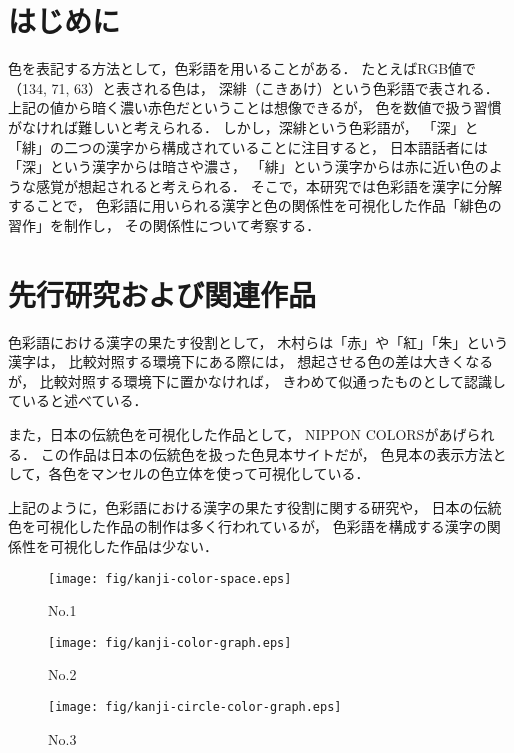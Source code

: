 \documentclass[a4j,twocolumn]{ujarticle} %
\newcommand{\workname}{緋色の習作}
\newcommand{\colorname}{色彩語}
\newcommand{\mysection}[1]{\vspace{-23pt}\section{#1}\vspace{-5pt}}
\begin{document}
\maketitle
\thispagestyle{myheadings}

\mysection{はじめに}

色を表記する方法として，\colorname{}を用いることがある．
たとえばRGB値で（134, 71, 63）と表される色は，
深緋（こきあけ）という\colorname{}で表される．
上記の値から暗く濃い赤色だということは想像できるが，
色を数値で扱う習慣がなければ難しいと考えられる．
しかし，深緋という\colorname{}が，
「深」と「緋」の二つの漢字から構成されていることに注目すると，
日本語話者には「深」という漢字からは暗さや濃さ，
「緋」という漢字からは赤に近い色のような感覚が想起されると考えられる．
そこで，本研究では\colorname{}を漢字に分解することで，
\colorname{}に用いられる漢字と色の関係性を可視化した作品「\workname{}」を制作し，
その関係性について考察する．

\mysection{先行研究および関連作品}

色彩語における漢字の果たす役割として，
木村ら\cite{Kimura1998}は「赤」や「紅」「朱」という漢字は，
比較対照する環境下にある際には，
想起させる色の差は大きくなるが，
比較対照する環境下に置かなければ，
きわめて似通ったものとして認識していると述べている．

また，日本の伝統色を可視化した作品として，
NIPPON COLORS\cite{NipponColors}があげられる．
この作品は日本の伝統色を扱った色見本サイトだが，
色見本の表示方法として，各色をマンセルの色立体を使って可視化している．

上記のように，色彩語における漢字の果たす役割に関する研究や，
日本の伝統色を可視化した作品の制作は多く行われているが，
色彩語を構成する漢字の関係性を可視化した作品は少ない．

\vspace{-1zh}

\begin{figure*}[h]
  \begin{center}
    \begin{minipage}{0.3\hsize}
      \begin{center}
        \texttt{[image: fig/kanji-color-space.eps]}
      \end{center}
      \caption{No.1}
      \label{fig:no1}
    \end{minipage}
    \begin{minipage}{0.3\hsize}
      \begin{center}
        \texttt{[image: fig/kanji-color-graph.eps]}
      \end{center}
      \caption{No.2}
      \label{fig:no2}
    \end{minipage}
    \begin{minipage}{0.3\hsize}
      \begin{center}
        \texttt{[image: fig/kanji-circle-color-graph.eps]}
      \end{center}
      \caption{No.3}
      \label{fig:no3}
    \end{minipage}
  \end{center}
\end{figure*}
\end{document}
